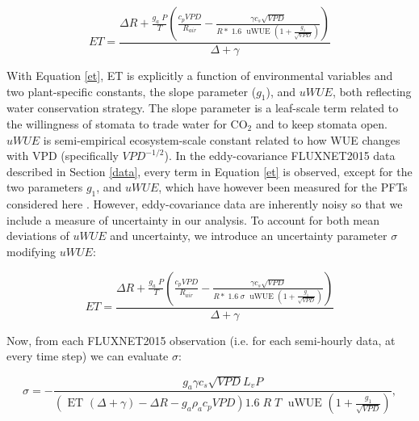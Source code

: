 \documentclass[draft,linenumbers]{agujournal}
\begin{document}
\begin{linenomath*}
  \begin{equation}
    ET = \frac{\Delta R + \frac{g_a\; P}{T} \left( \frac{ c_p VPD}{R_{air}} -  \frac{\gamma c_s \sqrt{VPD} }{ R* \; 1.6\; \text{ uWUE } (1 + \frac{g_1}{\sqrt{VPD}})} \right) }{ \Delta + \gamma}
    \label{et}
  \end{equation}
\end{linenomath*}

With Equation \ref{et}, ET is explicitly a function of environmental variables and two plant-specific constants, the slope parameter ($g_1$), and $uWUE$, both reflecting water conservation strategy. The slope parameter is a leaf-scale term related to the willingness of stomata to trade water for CO$_2$ and to keep stomata open. $uWUE$ is semi-empirical ecosystem-scale constant related to how WUE changes with VPD (specifically $VPD^{-1/2}$). In the eddy-covariance FLUXNET2015 data described in Section \ref{data}, every term in Equation \ref{et} is observed, except for the two parameters $g_1$, and $uWUE$, which have however been measured for the PFTs considered here \citep{Zhou_2015, Lin_2015}. However, eddy-covariance data are inherently noisy so that we include a measure of uncertainty in our analysis. To account for both mean deviations of $uWUE$ and uncertainty, we introduce an uncertainty parameter $\sigma$ modifying $uWUE$:

\begin{linenomath*}
  \begin{equation}
    ET = \frac{\Delta R + \frac{g_a\; P}{T} \left( \frac{ c_p VPD}{R_{air}} -  \frac{\gamma c_s \sqrt{VPD} }{ R* \; 1.6\; \sigma \; \text{ uWUE } (1 + \frac{g_1}{\sqrt{VPD}})} \right) }{ \Delta + \gamma}
    \label{et_sigma}
  \end{equation}
\end{linenomath*}

Now, from each FLUXNET2015 observation (i.e. for each semi-hourly data, at every time step) we can evaluate $\sigma$:

\begin{linenomath*}
  \begin{equation}
\sigma = - \frac{g_a \gamma c_s \sqrt{VPD} L_v P }{ \left(\text{ ET } ( \Delta + \gamma) - \Delta R - g_a \rho_a c_p VPD\right) 1.6 \; R\; T\; \text{ uWUE } (1 + \frac{g_1}{\sqrt{VPD}})},
    \label{sigma}
  \end{equation}
\end{linenomath*}
\end{document}
